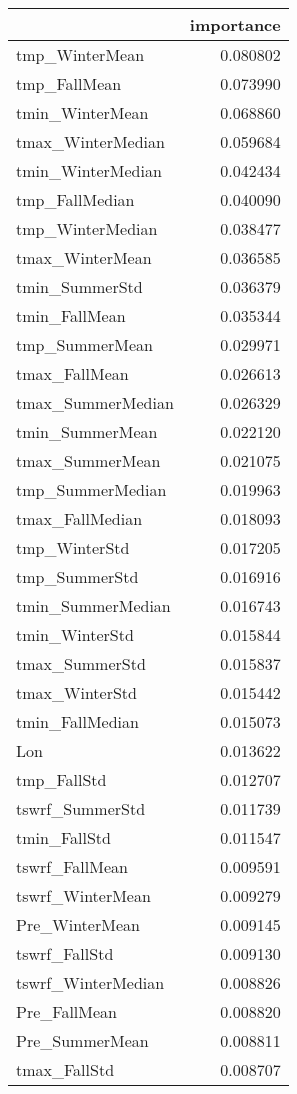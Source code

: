 \begin{tabular}{lr}
\toprule
 & importance \\
\midrule
tmp_WinterMean & 0.080802 \\
tmp_FallMean & 0.073990 \\
tmin_WinterMean & 0.068860 \\
tmax_WinterMedian & 0.059684 \\
tmin_WinterMedian & 0.042434 \\
tmp_FallMedian & 0.040090 \\
tmp_WinterMedian & 0.038477 \\
tmax_WinterMean & 0.036585 \\
tmin_SummerStd & 0.036379 \\
tmin_FallMean & 0.035344 \\
tmp_SummerMean & 0.029971 \\
tmax_FallMean & 0.026613 \\
tmax_SummerMedian & 0.026329 \\
tmin_SummerMean & 0.022120 \\
tmax_SummerMean & 0.021075 \\
tmp_SummerMedian & 0.019963 \\
tmax_FallMedian & 0.018093 \\
tmp_WinterStd & 0.017205 \\
tmp_SummerStd & 0.016916 \\
tmin_SummerMedian & 0.016743 \\
tmin_WinterStd & 0.015844 \\
tmax_SummerStd & 0.015837 \\
tmax_WinterStd & 0.015442 \\
tmin_FallMedian & 0.015073 \\
Lon & 0.013622 \\
tmp_FallStd & 0.012707 \\
tswrf_SummerStd & 0.011739 \\
tmin_FallStd & 0.011547 \\
tswrf_FallMean & 0.009591 \\
tswrf_WinterMean & 0.009279 \\
Pre_WinterMean & 0.009145 \\
tswrf_FallStd & 0.009130 \\
tswrf_WinterMedian & 0.008826 \\
Pre_FallMean & 0.008820 \\
Pre_SummerMean & 0.008811 \\
tmax_FallStd & 0.008707 \\

\end{tabular}
